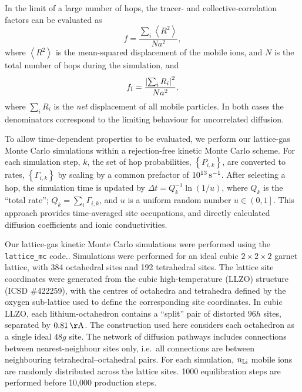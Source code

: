 \documentclass[aps,prb,twocolumn,superscriptaddress,reprint]{revtex4-1}
\newcommand{\set}[1]{\left\{#1\right\}}
\begin{document}
In the limit of a large number of hops, the tracer- and collective-correlation factors can be evaluated as
\begin{equation}
  f = \frac{\sum_i\left<R^2\right>}{Na^2},
  \label{eqn:tracer_correlation_factor}
\end{equation}
where $\left<R^2\right>$ is the mean-squared displacement of the mobile ions, and $N$ is the total number of hops during the simulation, and
\begin{equation}
  f_{\mathrm{I}} = \frac{\left|\sum_i R_i\right|^2}{Na^2},
  \label{eqn:collective_correlation_factor}
\end{equation}
where $\sum_i R_i$ is the \emph{net} displacement of all mobile particles. 
In both cases the denominators correspond to the limiting behaviour for uncorrelated diffusion.

To allow time-dependent properties to be evaluated, we perform our lattice-gas Monte Carlo simulations within a rejection-free kinetic Monte Carlo scheme. 
For each simulation step, $k$, the set of hop probabilities, $\set{P_{i,k}}$, are converted to rates, $\set{\Gamma_{i,k}}$ by scaling by a common prefactor of $10^{13}\,\mathrm{s}^{-1}$. 
After selecting a hop, the simulation time is updated by $\Delta t = Q_k^{-1}\ln\left(1/u\right)$, where $Q_k$ is the ``total rate''; $Q_k=\sum_i \Gamma_{i,k}$, and $u$ is a uniform random number $u\in\left(0,1\right]$. 
This approach provides time-averaged site occupations, and directly calculated diffusion coefficients and ionic conductivities.

Our lattice-gas kinetic Monte Carlo simulations were performed using the \texttt{lattice\_mc} code.\cite{lattice_mc_module}. 
Simulations were performed for an ideal cubic $2\times2\times2$ garnet lattice, with 384 octahedral sites and 192 tetrahedral sites. 
The lattice site coordinates were generated from the cubic high-temperature  (LLZO) structure (ICSD \#422259),\cite{AwakaEtAl_ChemLett2011} with the centres of octahedra and tetrahedra defined by the oxygen sub-lattice used to define the corresponding site coordinates. 
In cubic LLZO, each lithium-octahedron contains a ``split'' pair of distorted $96h$ sites, separated by $0.81\u{\AA}$. 
The construction used here considers each octahedron as a single ideal $48g$ site. 
The network of diffusion pathways includes connections between nearest-neighbour sites only, i.e.\ all connections are between neighbouring tetrahedral--octahedral pairs.  For each simulation, $n_{\mathrm{Li}}$ mobile ions are randomly distributed across the lattice sites. 1000 equilibration steps are performed before 10,000 production steps. 
\end{document}
